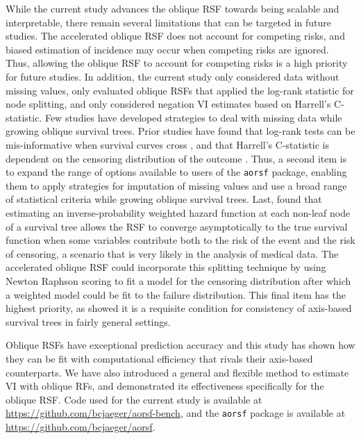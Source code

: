 \documentclass[twoside,11pt]{article}\usepackage[]{graphicx}\usepackage[]{xcolor}
\begin{document}
While the current study advances the oblique RSF towards being scalable and interpretable, there remain several limitations that can be targeted in future studies. The accelerated oblique RSF does not account for competing risks, and biased estimation of incidence may occur when competing risks are ignored. Thus, allowing the oblique RSF to account for competing risks is a high priority for future studies. In addition, the current study only considered data without missing values, only evaluated oblique RSFs that applied the log-rank statistic for node splitting, and only considered negation VI estimates based on Harrell's C-statistic. Few studies have developed strategies to deal with missing data while growing oblique survival trees. Prior studies have found that log-rank tests can be mis-informative when survival curves cross \citep{li2015statistical}, and that Harrell's C-statistic is dependent on the censoring distribution of the outcome \citep{uno2011c}. Thus, a second item is to expand the range of options available to users of the \texttt{aorsf} package, enabling them to apply strategies for imputation of missing values and use a broad range of statistical criteria while growing oblique survival trees. Last, \citet{cui2017consistency} found that estimating an inverse-probability weighted hazard function at each non-leaf node of a survival tree allows the RSF to converge asymptotically to the true survival function when some variables contribute both to the risk of the event and the risk of censoring, a scenario that is very likely in the analysis of medical data. The accelerated oblique RSF could incorporate this splitting technique by using Newton Raphson scoring to fit a model for the censoring distribution after which a weighted model could be fit to the failure distribution. This final item has the highest priority, as \citet{cui2017consistency} showed it is a requisite condition for consistency of axis-based survival trees in fairly general settings.


Oblique RSFs have exceptional prediction accuracy and this study has shown how they can be fit with computational efficiency that rivals their axis-based counterparts. We have also introduced a general and flexible method to estimate VI with oblique RFs, and demonstrated its effectiveness specifically for the oblique RSF. Code used for the current study is available at \href{https://github.com/bcjaeger/aorsf-bench}{https://github.com/bcjaeger/aorsf-bench}, and the \texttt{aorsf} package is available at \href{https://github.com/bcjaeger/aorsf}{https://github.com/bcjaeger/aorsf}.
\end{document}
